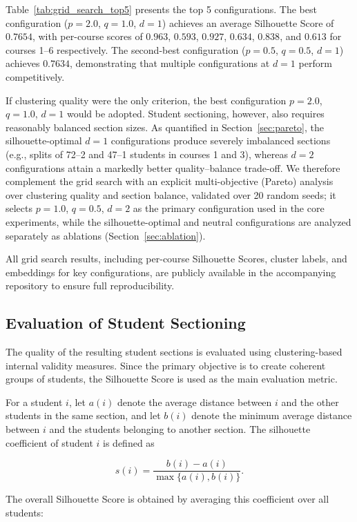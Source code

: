 \documentclass[pdflatex,sn-mathphys-num,iicol]{sn-jnl}%
\theoremstyle{thmstyleone}%
\theoremstyle{thmstyletwo}%
\theoremstyle{thmstylethree}%
\begin{document}
Table~\ref{tab:grid_search_top5} presents the top 5 configurations. The best configuration ($p=2.0$, $q=1.0$, $d=1$) achieves an average Silhouette Score of $0.7654$, with per-course scores of $0.963$, $0.593$, $0.927$, $0.634$, $0.838$, and $0.613$ for courses 1--6 respectively. The second-best configuration ($p=0.5$, $q=0.5$, $d=1$) achieves $0.7634$, demonstrating that multiple configurations at $d=1$ perform competitively.

If clustering quality were the only criterion, the best configuration $p=2.0$, $q=1.0$, $d=1$ would be adopted. Student sectioning, however, also requires reasonably balanced section sizes. As quantified in Section~\ref{sec:pareto}, the silhouette-optimal $d=1$ configurations produce severely imbalanced sections (e.g., splits of 72--2 and 47--1 students in courses 1 and 3), whereas $d=2$ configurations attain a markedly better quality--balance trade-off. We therefore complement the grid search with an explicit multi-objective (Pareto) analysis over clustering quality and section balance, validated over 20 random seeds; it selects $p=1.0$, $q=0.5$, $d=2$ as the primary configuration used in the core experiments, while the silhouette-optimal and neutral configurations are analyzed separately as ablations (Section~\ref{sec:ablation}).

All grid search results, including per-course Silhouette Scores, cluster labels, and embeddings for key configurations, are publicly available in the accompanying repository to ensure full reproducibility.

\subsection{Evaluation of Student Sectioning}
\label{subsec:evaluation}

The quality of the resulting student sections is evaluated using clustering-based internal validity measures. Since the primary objective is to create coherent groups of students, the Silhouette Score is used as the main evaluation metric.

For a student $i$, let $a(i)$ denote the average distance between $i$ and the other students in the same section, and let $b(i)$ denote the minimum average distance between $i$ and the students belonging to another section. The silhouette coefficient of student $i$ is defined as

$$
s(i)=
\frac{b(i)-a(i)}
{\max\{a(i),b(i)\}}.
$$

The overall Silhouette Score is obtained by averaging this coefficient over all students:
\end{document}
